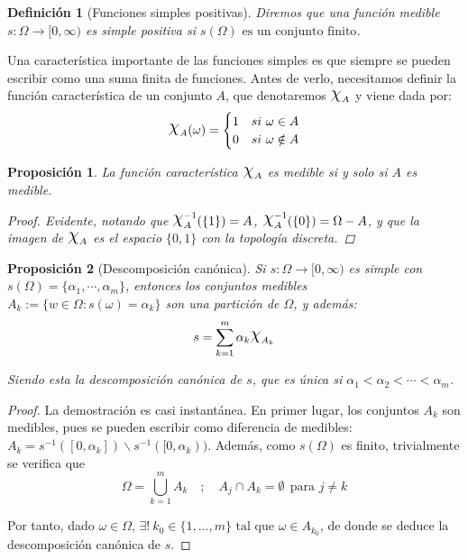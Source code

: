\documentclass[11pt, a4paper]{article}
\DeclareRobustCommand{\rchi}{{\Large \mathpalette\irchi\relax}}
\newcommand{\irchi}[2]{\raisebox{0.6\depth}{$#1\chi$}} %
\theoremstyle{theorem-style}
\newtheorem{nprop}{Proposición}[section]
\theoremstyle{definition-style}
\newtheorem{ndef}{Definición}[section]
\theoremstyle{remark-style}
\theoremstyle{example-style}
\begin{document}
\begin{ndef}[Funciones simples positivas]
  Diremos que una función medible $s: \Omega \to [0,\infty)$ es simple positiva si 
  $s(\Omega) \text{ es un conjunto finito}$.
\end{ndef}

Una característica importante de las funciones simples es que siempre se pueden escribir como una suma finita de funciones. Antes de verlo, necesitamos definir la función característica de un conjunto $A$, que denotaremos $\rchi_A$ y viene dada por:
\[
  \rchi_A(\omega)= \begin{cases}
    1 & si \ \omega \in A\\
    0 & si \ \omega \notin A
  \end{cases}
\]

\begin{nprop} \label{chi} La función característica $\rchi_A$ es medible si y solo si $A$ es medible.

\begin{proof}
	Evidente, notando que $\rchi^{-1}_A(\{1\}) = A$, $\rchi^{-1}_A(\{0\}) = \Omega - A$, y que la imagen de $\rchi_A$ es el espacio $\{0,1\}$ con la topología discreta.
\end{proof}
	
\end{nprop}

\begin{nprop}[Descomposición canónica]
  Si $s:\Omega \to [0,\infty)$ es simple con \mbox{$s(\Omega) =  \{\alpha_1,\cdots, \alpha_m\}$}, entonces los conjuntos medibles $A_k:= \{w \in \Omega: s(\omega)= \alpha_k\}$ son una partición de $\Omega$, y además:
  \[
    s = \sum_{k=1}^m \alpha_k \rchi_{A_k}
  \]
  
  Siendo esta la descomposición canónica de $s$, que es única si $\alpha_1 < \alpha_2 <  \cdots <\alpha_m$.
\end{nprop}

\begin{proof} La demostración es casi instantánea. En primer lugar, los conjuntos $A_k$ son medibles, pues se pueden escribir como diferencia de medibles: \mbox{$A_k = s^{-1}([0,\alpha_k])\backslash s^{-1}([0,\alpha_k))$.} Además, como $s(\Omega)$ es finito, trivialmente se verifica que $$\Omega = \bigcup_{k=1}^m A_k \quad ; \quad A_j \cap A_k = \emptyset \ \ \text{para } j \ne k$$

  Por tanto, dado $\omega \in \Omega$, $\exists ! \ k_0 \in \{1,\dots,m\} \text{ tal que } \omega \in A_{k_0}$, de donde se deduce la descomposición canónica de $s$.
\end{proof}
\end{document}
